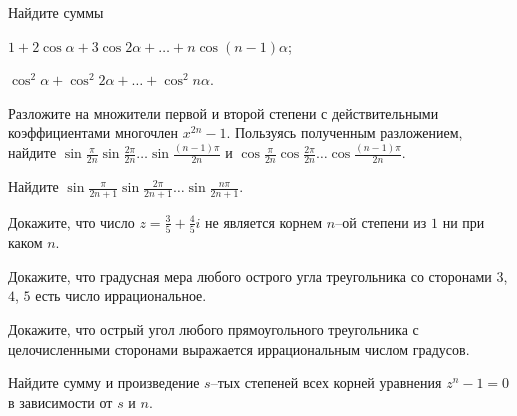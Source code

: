\documentclass[a4paper, 12pt, num=22, date=16.09.2019]{listok}
\begin{document}
\begin{problem}
	Найдите суммы
	\begin{multienum}{2}
		\item $1 + 2 \cos \alpha + 3 \cos{2\alpha} + \ldots + n \cos{(n−1)\alpha}$;
		\item $\cos^2 \alpha + \cos^2 {2\alpha} + \ldots + \cos^2 {n\alpha}$.
	\end{multienum}
\end{problem}
\begin{problem}
\begin{probparts}
	\item Разложите на множители первой и второй степени с действительными коэффициентами многочлен $x^{2n} - 1$.
	Пользуясь полученным разложением, найдите $\sin{\frac{\pi}{2n}}\sin{\frac{2\pi}{2n}}\ldots\sin{\frac{(n - 1)\pi}{2n}}$ и
	$\cos{\frac{\pi}{2n}}\cos{\frac{2\pi}{2n}}\ldots\cos{\frac{(n - 1)\pi}{2n}}$.
	\item Найдите $\sin{\frac{\pi}{2n + 1}}\sin{\frac{2\pi}{2n + 1}}\ldots\sin{\frac{n\pi}{2n + 1}}$.
\end{probparts}
\end{problem}
\begin{problem}
\begin{probparts}
	\item Докажите, что число $z = \frac35 + \frac45 i$ не является корнем $n$--ой степени из $1$ ни при каком $n$.
	\item Докажите, что градусная мера любого острого угла треугольника со сторонами $3$, $4$, $5$ есть число иррациональное.
	\item Докажите, что острый угол любого прямоугольного треугольника с целочисленными сторонами выражается иррациональным числом градусов.
\end{probparts}
\end{problem}
\begin{problem}
	Найдите сумму и произведение $s$--тых степеней всех корней уравнения $z^n -1 = 0$ в зависимости от $s$ и $n$.
\end{problem}
\end{document}
